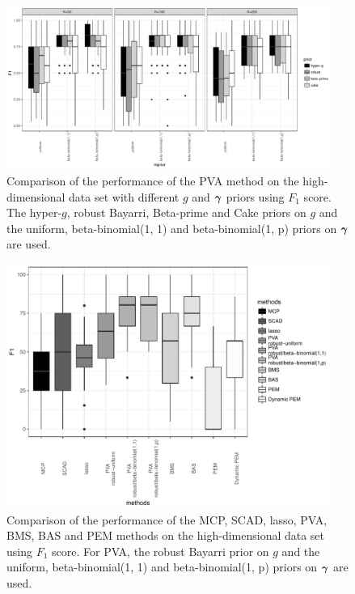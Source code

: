 \begin{figure}[h!]
	\begin{center}
		\includegraphics[width=0.95\textwidth]{./highDimPVA_F1.pdf}  
	\end{center}
	\caption{Comparison of the performance of the PVA method on the
						high-dimensional data set with different $g$ and ${\boldsymbol \gamma}$ priors using $F_1$ score.
						The hyper-$g$,
						robust Bayarri, Beta-prime and Cake priors on $g$ and the uniform, beta-binomial(1, 1) and beta-binomial(1, p) priors on ${\boldsymbol \gamma}$ are used.}
	\label{fig:highDimPVA_F1}
\end{figure}

\begin{figure}[h!]
	\begin{center}	
		\includegraphics[width=0.95\textwidth]{./highDimPVA_F1_compare.pdf}  
	\end{center}
	\caption{Comparison of the performance of the MCP, SCAD, lasso, PVA, BMS, BAS and PEM methods on the
						high-dimensional data set using $F_1$ score. For PVA, the
						robust Bayarri prior on $g$ and the uniform, beta-binomial(1, 1) and beta-binomial(1, p) priors
						on ${\boldsymbol \gamma}$ are used.}
	\label{fig:highDimPVA_F1_compare}
\end{figure}

